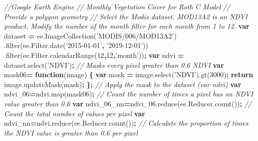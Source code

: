 \documentclass[
  10pt,
  b5paper,
]{book}
\newenvironment{Shaded}{\begin{snugshade}}{\end{snugshade}}
\newcommand{\AttributeTok}[1]{\textcolor[rgb]{0.77,0.63,0.00}{#1}}
\newcommand{\CommentTok}[1]{\textcolor[rgb]{0.56,0.35,0.01}{\textit{#1}}}
\newcommand{\ControlFlowTok}[1]{\textcolor[rgb]{0.13,0.29,0.53}{\textbf{#1}}}
\newcommand{\DecValTok}[1]{\textcolor[rgb]{0.00,0.00,0.81}{#1}}
\newcommand{\KeywordTok}[1]{\textcolor[rgb]{0.13,0.29,0.53}{\textbf{#1}}}
\newcommand{\NormalTok}[1]{#1}
\newcommand{\OperatorTok}[1]{\textcolor[rgb]{0.81,0.36,0.00}{\textbf{#1}}}
\newcommand{\StringTok}[1]{\textcolor[rgb]{0.31,0.60,0.02}{#1}}
\newcommand{\VariableTok}[1]{\textcolor[rgb]{0.00,0.00,0.00}{#1}}
\begin{document}
\begin{Shaded}
\begin{Highlighting}[]
\CommentTok{//Google Earth Engine }
\CommentTok{// Monthly Vegetation Cover for Roth C Model   }
 \CommentTok{// Provide a polygon geometry}
 \CommentTok{// Select the Modis dataset. MOD13A2 is an NDVI product. Modify the number of the month filter for each month from 1 to 12. }
 \KeywordTok{var}\NormalTok{ dataset }\OperatorTok{=} \VariableTok{ee}\NormalTok{.}\AttributeTok{ImageCollection}\NormalTok{(}\StringTok{'MODIS/006/MOD13A2'}\NormalTok{)}
\NormalTok{                  .}\AttributeTok{filter}\NormalTok{(}\VariableTok{ee}\NormalTok{.}\VariableTok{Filter}\NormalTok{.}\AttributeTok{date}\NormalTok{(}\StringTok{'2015-01-01'}\OperatorTok{,} \StringTok{'2019-12-01'}\NormalTok{))}
\NormalTok{                  .}\AttributeTok{filter}\NormalTok{(}\VariableTok{ee}\NormalTok{.}\VariableTok{Filter}\NormalTok{.}\AttributeTok{calendarRange}\NormalTok{(}\DecValTok{12}\OperatorTok{,}\DecValTok{12}\OperatorTok{,}\StringTok{'month'}\NormalTok{))}\OperatorTok{;}
 \KeywordTok{var}\NormalTok{ ndvi }\OperatorTok{=} \VariableTok{dataset}\NormalTok{.}\AttributeTok{select}\NormalTok{(}\StringTok{'NDVI'}\NormalTok{)}\OperatorTok{;}
 \CommentTok{// Masks every pixel greater than 0.6 NDVI}
\KeywordTok{var}\NormalTok{ mask06}\OperatorTok{=} \KeywordTok{function}\NormalTok{(image) }\OperatorTok{\{}
    \KeywordTok{var}\NormalTok{ mask }\OperatorTok{=} \VariableTok{image}\NormalTok{.}\AttributeTok{select}\NormalTok{(}\StringTok{'NDVI'}\NormalTok{).}\AttributeTok{gt}\NormalTok{(}\DecValTok{3000}\NormalTok{)}\OperatorTok{;}
    \ControlFlowTok{return} \VariableTok{image}\NormalTok{.}\AttributeTok{updateMask}\NormalTok{(mask)}\OperatorTok{;}
  \OperatorTok{\};}
 \CommentTok{// Apply the mask to the dataset (var ndvi)}
\KeywordTok{var}\NormalTok{ ndvi_06}\OperatorTok{=}\VariableTok{ndvi}\NormalTok{.}\AttributeTok{map}\NormalTok{(mask06)}\OperatorTok{;} 
 \CommentTok{// Count the number of times a pixel has an NDVI value greater than 0.6}
\KeywordTok{var}\NormalTok{ ndvi_06_nn}\OperatorTok{=}\VariableTok{ndvi_06}\NormalTok{.}\AttributeTok{reduce}\NormalTok{(}\VariableTok{ee}\NormalTok{.}\VariableTok{Reducer}\NormalTok{.}\AttributeTok{count}\NormalTok{())}\OperatorTok{;}
 \CommentTok{// Count the total number of values per pixel}
\KeywordTok{var}\NormalTok{ ndvi_nn}\OperatorTok{=}\VariableTok{ndvi}\NormalTok{.}\AttributeTok{reduce}\NormalTok{(}\VariableTok{ee}\NormalTok{.}\VariableTok{Reducer}\NormalTok{.}\AttributeTok{count}\NormalTok{())}\OperatorTok{;}
 \CommentTok{// Calculate the proportion of times the NDVI value is greater than 0.6 per pixel}

\end{Highlighting}
\end{Shaded}
\end{document}
